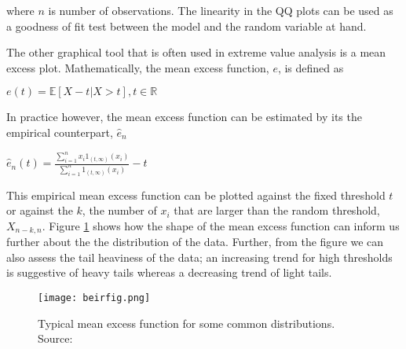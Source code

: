 \documentclass[a4paper]{article}
\begin{document}
\noindent where $n$ is number of observations. The linearity in the QQ plots can be used as a goodness of fit test between the model and the random variable at hand.

The other graphical tool that is often used in extreme value analysis is a mean excess plot. Mathematically, the mean excess function, $e$,  is defined as

 \centerline{$e(t) = \mathbb{E}[X-t | X>t], t \in \mathbb{R}$} 
 
In practice however, the mean excess function can be estimated by its the empirical counterpart, $\hat{e}_n$ \citep[ch.~1]{beirlant}

\centerline{$\hat{e}_n(t) = \frac{\sum\limits_{i=1}^n x_i 1_{(t,\infty)}(x_i)}{\sum\limits_{i=1}^n 1_{(t,\infty)}(x_i)} - t$}

This empirical mean excess function can be plotted against the fixed threshold $t$ or against the $k$, the number of $x_i$ that are larger than the random threshold, $X_{n-k,n}$. Figure \ref{fig:beir} shows how the shape of the mean excess function can inform us further about the the distribution of the data. Further, from the figure we can also assess the tail heaviness of the data; an increasing trend for high thresholds is suggestive of heavy tails whereas a decreasing trend of light tails.

\begin{figure}
\centering
\texttt{[image: beirfig.png]}
\caption{Typical mean excess function for some common distributions. Source: \cite{beirlant}}
\label{fig:beir} 
\end{figure}






\end{document}

